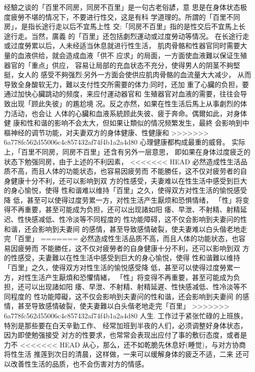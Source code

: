 \documentclass[12pt,UTF8]{ctexbook}
\begin{document}
经驗之谈的「百里不同房，同房不百里」是一句古老俗諺，意
思是在身体状态极度疲勞不堪的情况下，不要进行性交，这是有科
学道理的。所謂的「百里不同房」，是指长途行走以后不宜馬上性
交;「同房不百里」指的是性交后不宜馬上长途行走。当然，廣義
的「百里」还包括劇烈運动或过度勞动等情况。
在长途行走或过度勞累以后，人未经适当休息就进行性生活，
肌肉骨骼和性器官同时需要大量的血液供给，就会造成血液「供不
应求」的局面，一方面使血液難以保证生殖器官的「重点」供应，
容易让局部的充血状态不充分，使得男人的阴茎不夠堅挺，女人的
感受不夠强烈;另外一方面会使供应肌肉骨骼的血流量大大减少，
从而导致全身酸软无力，難以支付性交所需要的体力;同时，还加
重了心臟的负担，要通过加快心臟跳动的频度，来应付運动器官和
生殖器官对血液的需要，往往会导致出现「顾此失彼」的尷尬境
况。反之亦然，如果在性生活后馬上从事劇烈的体力活动，也会让
人体的心臟和血液系統顾此失彼、疲于奔命。偶爾如此，对身体健
康和性和谐的影响不会太大，但如果让類似的情况频繁发生，最終
会影响到中樞神经的调节功能，对夫妻双方的身体健康、性健康和
>>>>>>> 6a778fc562d55006c4c857432af74f4b1a2a4d80
心理健康都构成最重的威脅。
实际上，「百里不同房，同房不百里」还含有另外一层意思，
即如果在身体过度疲乏的状态下勉强同房，由于上述的不利因素，
<<<<<<< HEAD
必然造成性生活品质不高，而且人体的功能状态，也容易因疲劳而
不能勝任，这不仅对疲劳者的自身健康十分不利，还可以影响到双
方的性感受，夫妻难以在性生活中感受到巨大的身心愉悦，使得
性和谐难以维持「百里」之久，使得双方对性生活的愉悦感受降
低，甚至可以使得过度劳累一方，对性生活产生厭烦和恐惧情绪，
「性」将变得不再重要，甚至可能成为负担，还可以出现諸如阳
痿、早泄、不射精、射精延迟、性快感减低、性冷淡等不同程度的
性功能障碍，这不仅会影响到夫妻问的性和谐，还会影响到夫妻间
的感情，甚至导致感情破裂，使夫妻难以白头偕老地走完「百里」
=======
必然造成性生活品质不高，而且人体的功能状态，也容易因疲勞而
不能勝任，这不仅对疲勞者的自身健康十分不利，还可以影响到双
方的性感受，夫妻難以在性生活中感受到巨大的身心愉悦，使得
性和谐難以维持「百里」之久，使得双方对性生活的愉悦感受降
低，甚至可以使得过度勞累一方，对性生活产生厭煩和恐懼情緒，
「性」将变得不再重要，甚至可能成为负担，还可以出现諸如阳
痿、早泄、不射精、射精延遲、性快感减低、性冷淡等不同程度的
性功能障礙，这不仅会影响到夫妻问的性和谐，还会影响到夫妻间
的感情，甚至导致感情破裂，使夫妻難以白头偕老地走完「百里」
>>>>>>> 6a778fc562d55006c4c857432af74f4b1a2a4d80
人生.
工作过于紧张忙碌的上班族，特別是那些要在白天辛勤工作、
经常加班到半夜的人们，必须调整好身体状态，因为即使勉强接受
对方的性要求，也常常会表现出应付了事的敷衍态度，或者是力不
<<<<<<< HEAD
从心，那么，还不如乾脆先休息好(睡觉)，与对方协商将性生活
推莲到次日的清晨，这样做，一来可以缓解身体的疲乏不适，二来
还可以改善性生活的品质，也不会伤害对方的情感。
\end{document}
